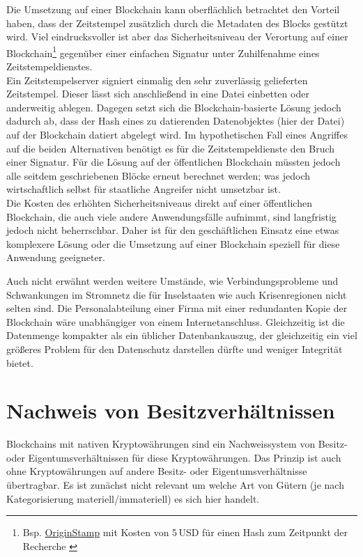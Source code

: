 Die Umsetzung auf einer Blockchain kann oberflächlich betrachtet den Vorteil haben, dass der Zeitstempel zusätzlich durch die Metadaten des Blocks gestützt wird. Viel eindrucksvoller ist aber das Sicherheitsniveau der Verortung auf einer Blockchain\footnote{Bsp. \href{https://app.originstamp.org/}{OriginStamp} mit Kosten von 5\,USD für einen Hash zum Zeitpunkt der Recherche \autocite{w:originstamp}} gegenüber einer einfachen Signatur unter Zuhilfenahme eines Zeitstempeldienstes. \\
Ein Zeitstempelserver signiert einmalig den sehr zuverlässig gelieferten Zeitstempel. Dieser lässt sich anschließend in \zB{} eine Datei einbetten oder anderweitig ablegen. Dagegen setzt sich die Blockchain-basierte Lösung jedoch dadurch ab, dass der Hash eines zu datierenden Datenobjektes (hier der Datei) auf der Blockchain datiert abgelegt wird. Im hypothetischen Fall eines Angriffes auf die beiden Alternativen benötigt es für die Zeitstempeldienste den Bruch einer Signatur. Für die Lösung auf der öffentlichen Blockchain müssten jedoch alle seitdem geschriebenen Blöcke erneut berechnet werden; was jedoch wirtschaftlich selbst für staatliche Angreifer nicht umsetzbar ist. \\
Die Kosten des erhöhten Sicherheitsniveaus direkt auf einer öffentlichen Blockchain, die auch viele andere Anwendungsfälle aufnimmt, sind langfristig jedoch nicht beherrschbar. Daher ist für den geschäftlichen Einsatz eine etwas komplexere Lösung oder die Umsetzung auf einer Blockchain speziell für diese Anwendung geeigneter.

Auch nicht erwähnt werden weitere Umstände, wie Verbindungsprobleme und Schwankungen im Stromnetz die für Inselstaaten wie auch Krisenregionen nicht selten sind. Die Personalabteilung einer Firma mit einer redundanten Kopie der Blockchain wäre unabhängiger von einem Internetanschluss. Gleichzeitig ist die Datenmenge kompakter als ein üblicher Datenbankauszug, der gleichzeitig ein viel größeres Problem für den Datenschutz darstellen dürfte und weniger Integrität bietet.

\section{Nachweis von Besitzverhältnissen}\label{uc:owning}

Blockchains mit nativen Kryptowährungen sind ein Nachweissystem von Besitz- oder Eigentumsverhältnissen für diese Kryptowährungen.
Das Prinzip ist auch ohne Kryptowährungen auf andere Besitz- oder Eigentumsverhältnisse übertragbar.
Es ist zunächst nicht relevant um welche Art von Gütern (je nach Kategorisierung \zB{} materiell/immateriell) es sich hier handelt.

